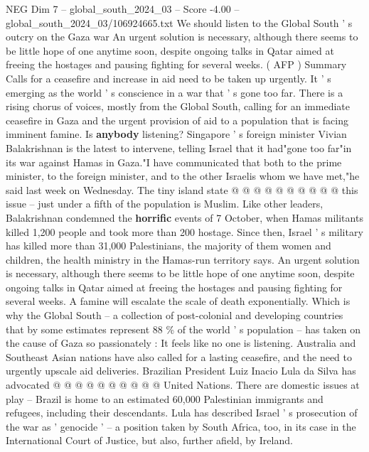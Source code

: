 \begin{textsample}{NEG Dim 7 – global\_south\_2024\_03 – Score -4.00 – global\_south\_2024\_03/106924665.txt}  \label{ex:f7_neg_423}
We should listen to the Global South ' s outcry on the Gaza war An urgent solution is necessary, although there seems to be little hope of one anytime soon, despite ongoing talks in Qatar aimed at freeing the hostages and pausing fighting for several weeks. ( AFP ) Summary Calls for a ceasefire and increase in aid need to be taken up urgently.
It ' s emerging as the world ' s conscience in a war that ' s gone too far.
There is a rising chorus of voices, mostly from the Global South, calling for an immediate ceasefire in Gaza and the urgent provision of aid to a population that is facing imminent famine.
Is \textbf{anybody} listening?
Singapore ' s foreign minister Vivian Balakrishnan is the latest to intervene, telling Israel that it had"gone too far"in its war against Hamas in Gaza."I have communicated that both to the prime minister, to the foreign minister, and to the other Israelis whom we have met,"he said last week on Wednesday.
The tiny island state @ @ @ @ @ @ @ @ @ @ this issue -- just under a fifth of the population is Muslim.
Like other leaders, Balakrishnan condemned the \textbf{horrific} events of 7 October, when Hamas militants killed 1,200 people and took more than 200 hostage.
Since then, Israel ' s military has killed more than 31,000 Palestinians, the majority of them women and children, the health ministry in the Hamas-run territory says.
An urgent solution is necessary, although there seems to be little hope of one anytime soon, despite ongoing talks in Qatar aimed at freeing the hostages and pausing fighting for several weeks.
A famine will escalate the scale of death exponentially.
Which is why the Global South -- a collection of post-colonial and developing countries that by some estimates represent 88 \% of the world ' s population -- has taken on the cause of Gaza so passionately : It feels like no one is listening.
Australia and Southeast Asian nations have also called for a lasting ceasefire, and the need to urgently upscale aid deliveries.
Brazilian President Luiz Inacio Lula da Silva has advocated @ @ @ @ @ @ @ @ @ @ United Nations.
There are domestic issues at play -- Brazil is home to an estimated 60,000 Palestinian immigrants and refugees, including their descendants.
Lula has described Israel ' s prosecution of the war as ' genocide ' -- a position taken by South Africa, too, in its case in the International Court of Justice, but also, further afield, by Ireland.

\end{textsample}
